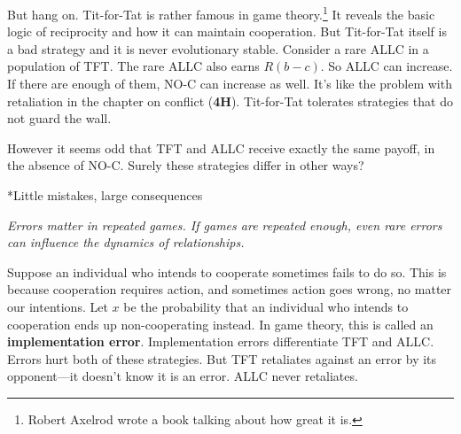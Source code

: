 \documentclass[10pt,reqno]{amsbook}
\makeatletter
\newcommand{\bemph}[1]{{\textbf{\textcolor{bemphcol}{#1}}}}
\renewcommand\section{\@startsection{section}{1}
\z@{.7\linespacing\@plus\linespacing}{.5\linespacing}
{\large\bfseries\itshape}}
\numberwithin{equation}{chapter}
\newenvironment{precis}
{\noi\itshape}
{\vspace{6pt}}
\newcommand{\noi}{\noindent}
\makeatother
\begin{document}
But hang on. Tit-for-Tat is rather famous in game theory.\footnote{Robert Axelrod wrote a book talking about how great it is.} It reveals the basic logic of reciprocity and how it can maintain cooperation. But Tit-for-Tat itself is a bad strategy and it is never evolutionary stable. Consider a rare ALLC in a population of TFT. The rare ALLC also earns $R(b-c)$. So ALLC can increase. If there are enough of them, NO-C can increase as well. It's like the problem with retaliation in the chapter on conflict (\bemph{4H}). Tit-for-Tat tolerates strategies that do not guard the wall.

However it seems odd that TFT and ALLC receive exactly the same payoff, in the absence of NO-C. Surely these strategies differ in other ways?

\section*{Little mistakes, large consequences}

\begin{precis}Errors matter in repeated games. If games are repeated enough, even rare errors can influence the dynamics of relationships.\end{precis}

Suppose an individual who intends to cooperate sometimes fails to do so. This is because cooperation requires action, and sometimes action goes wrong, no matter our intentions. 
Let $x$ be the probability that an individual who intends to cooperation ends up non-cooperating instead. In game theory, this is called an \bemph{implementation error}. Implementation errors differentiate TFT and ALLC. Errors hurt both of these strategies. But TFT retaliates against an error by its opponent---it doesn't know it is an error. ALLC never retaliates. 
\end{document}
